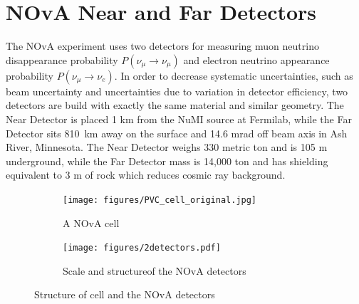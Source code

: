 \section{NOvA Near and Far Detectors}
The NOvA experiment uses two detectors for measuring muon neutrino disappearance probability 
$P(\nu_\mu \rightarrow \nu_\mu)$ and electron neutrino appearance probability $P(\nu_\mu \rightarrow \nu_e)$. 
In order to decrease systematic uncertainties, such as beam uncertainty and uncertainties due to variation
in detector efficiency, two detectors are build with exactly the same material and 
similar geometry. The Near Detector is placed 1 km from the NuMI source at Fermilab, while the 
Far Detector sits 810~km away on the surface and 14.6 mrad off beam axis in Ash River, Minnesota. 
The Near Detector weighs 330 metric ton and is 105 m underground, while the Far Detector mass is 
14,000 ton and has shielding equivalent to 3 m of rock which reduces cosmic ray background.
\begin{figure}
\begin{subfigure}{.2\textwidth}
  \centering
  \texttt{[image: figures/PVC\_cell\_original.jpg]}
  \caption{A NOvA cell}
  \label{fig:cell}
\end{subfigure}%
\begin{subfigure}{.8\textwidth}
  \centering
  \texttt{[image: figures/2detectors.pdf]}
  \caption{Scale and structureof the NOvA detectors}
  \label{fig:2detectors}
\end{subfigure}
\caption{Structure of cell and the NOvA detectors}
\label{fig:cell_detectors}
\end{figure}

